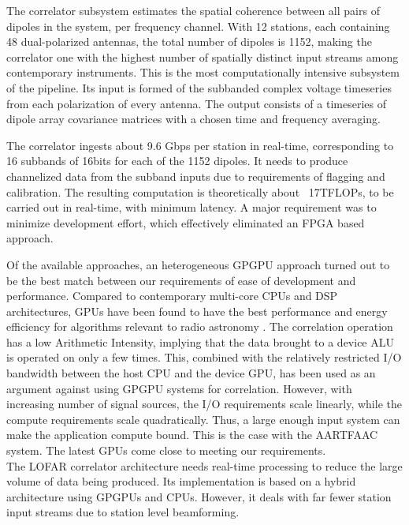 \documentclass{ws-jai}
\begin{document}
The correlator  subsystem estimates the  spatial coherence between all  pairs of
dipoles in the system, per frequency  channel. With 12 stations, each containing
48 dual-polarized  antennas, the  total number  of dipoles  is 1152,  making the
correlator one with the highest number of spatially distinct input streams among
contemporary instruments.  This is  the most computationally intensive subsystem
of  the  pipeline.   Its  input  is formed  of  the  subbanded  complex  voltage
timeseries from  each polarization of every  antenna.  The output consists  of a
timeseries of dipole array covariance matrices  with a chosen time and frequency
averaging.

The correlator ingests about 9.6 Gbps per station in real-time, corresponding to
16  subbands of  16bits for  each  of the  1152  dipoles.  It  needs to  produce
channelized data  from the subband  inputs due  to requirements of  flagging and
calibration. The resulting  computation is theoretically about  ~17TFLOPs, to be
carried out  in real-time,  with minimum  latency.  A  major requirement  was to
minimize  development  effort,  which   effectively  eliminated  an  FPGA  based
approach.

Of the available approaches, an heterogeneous GPGPU approach turned out to be the
best  match between  our requirements  of ease  of development  and performance.
Compared to contemporary  multi-core CPUs and DSP architectures,  GPUs have been
found to have the best performance and energy efficiency for algorithms relevant
to radio astronomy \cite{romein2016comparison}.  The correlation operation has a
low Arithmetic  Intensity, implying  that the  data brought to  a device  ALU is
operated on only a few times.  This, combined with the relatively restricted I/O
bandwidth between the host CPU and the  device GPU, has been used as an argument
against using GPGPU systems for  correlation. However, with increasing number of
signal  sources,  the  I/O  requirements   scale  linearly,  while  the  compute
requirements scale quadratically. Thus, a large enough input system can make the
application compute bound. This is the  case with the AARTFAAC system. The latest
GPUs come close to meeting our requirements.\\ The LOFAR correlator architecture
needs real-time  processing to reduce the  large volume of data  being produced.
Its implementation  is based  on a  hybrid architecture  using GPGPUs  and CPUs.
However, it  deals with  far fewer  station input streams  due to  station level
beamforming.
\end{document}
